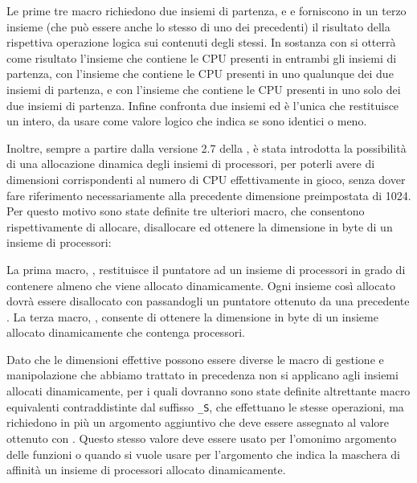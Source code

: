 Le prime tre macro richiedono due insiemi di partenza,  e
 e forniscono in un terzo insieme  (che può
essere anche lo stesso di uno dei precedenti) il risultato della rispettiva
operazione logica sui contenuti degli stessi. In sostanza con 
si otterrà come risultato l'insieme che contiene le CPU presenti in entrambi
gli insiemi di partenza, con  l'insieme che contiene le CPU
presenti in uno qualunque dei due insiemi di partenza, e con 
l'insieme che contiene le CPU presenti in uno solo dei due insiemi di
partenza. Infine  confronta due insiemi ed è l'unica che
restituisce un intero, da usare come valore logico che indica se sono identici
o meno.

Inoltre, sempre a partire dalla versione 2.7 della , è stata
introdotta la possibilità di una allocazione dinamica degli insiemi di
processori, per poterli avere di dimensioni corrispondenti al numero di CPU
effettivamente in gioco, senza dover fare riferimento necessariamente alla
precedente dimensione preimpostata di 1024. Per questo motivo sono state
definite tre ulteriori macro, che consentono rispettivamente di allocare,
disallocare ed ottenere la dimensione in byte di un insieme di processori:

{\centering
\vspace{3pt}
\begin{funcbox}{ 
}
\end{funcbox}}

La prima macro, , restituisce il puntatore ad un insieme di
processori in grado di contenere almeno  che viene allocato
dinamicamente. Ogni insieme così allocato dovrà essere disallocato con
 passandogli un puntatore ottenuto da una precedente
. La terza macro, , consente di
ottenere la dimensione in byte di un insieme allocato dinamicamente che
contenga  processori.

Dato che le dimensioni effettive possono essere diverse le macro di gestione e
manipolazione che abbiamo trattato in precedenza non si applicano agli insiemi
allocati dinamicamente, per i quali dovranno sono state definite altrettante
macro equivalenti contraddistinte dal suffisso \texttt{\_S}, che effettuano le
stesse operazioni, ma richiedono in più un argomento
aggiuntivo  che deve essere assegnato al valore ottenuto con
. Questo stesso valore deve essere usato per l'omonimo
argomento delle funzioni  o 
quando si vuole usare per l'argomento che indica la maschera di affinità un
insieme di processori allocato dinamicamente.

